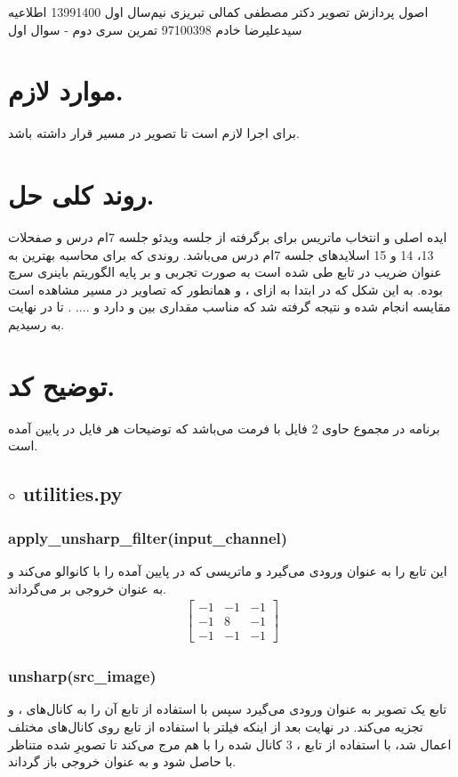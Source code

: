 \documentclass[a4paper,12pt]{article}
\begin{document}
	\handout
	{اصول پردازش تصویر}
	{دکتر مصطفی کمالی تبریزی}
	{نیم‌سال اول 1399\lr{-}1400}
	{اطلاعیه}
	{سیدعلیرضا خادم}
	{97100398}
	{تمرین سری دوم - سوال اول}
	\section*{موارد لازم.}
	برای اجرا لازم است تا تصویر
	در مسیر
	قرار داشته باشد.
	\section*{روند کلی حل.}
	ایده اصلی و انتخاب ماتریس برای 
	برگرفته از جلسه ویدئو جلسه 7ام درس و صفحلات 13، 14 و 15 اسلاید‌های جلسه 7ام درس می‌باشد. روندی که برای محاسبه بهترین 
	به عنوان ضریب
	در تابع 
	طی شده است به صورت تجربی و بر پایه الگوریتم باینری سرچ بوده. به این شکل که در ابتدا به ازای
	،
	و
	همانطور که تصاویر در مسیر 
	مشاهده است مقایسه انجام شده و نتیجه گرفته شد که
	مناسب مقداری بین
	و 
	دارد و .... . تا در نهایت به 
	رسیدیم. 
	
	\section*{توضیح کد.}
	برنامه در مجموع حاوی 2 فایل با فرمت
	می‌باشد که توضیحات هر فایل در پایین آمده است.
	\subsection*{$\circ$ utilities.py}
	\subsubsection*{apply\_unsharp\_filter(input\_channel)}
	این  تابع 
	را به عنوان ورودی می‌گیرد و ماتریسی که در پایین آمده را با 
	کانوالو می‌کند و به عنوان خروجی بر می‌گرداند.\\
	\begin{align*}
		\begin{bmatrix}
			-1 & -1 & -1\\
			-1 & 8  & -1\\
			-1 & -1 & -1
		\end{bmatrix}
	\end{align*}
	
	\subsubsection*{unsharp(src\_image)}
	تابع 
	یک تصویر به عنوان ورودی می‌گیرد  سپس با استفاده از تابع 
	آن را به کانال‌های 
	،
	و
	تجزیه می‌کند. در نهایت بعد از اینکه فیلتر 
	با استفاده از تابع 
	روی کانال‌های مختلف اعمال شد، با استفاده از تابع 
	، 3 کانال 
	شده را با هم مرج می‌کند تا تصویرِ
	شده متناظر با 
	حاصل شود و به عنوان خروجی باز گرداند.
\end{document}
